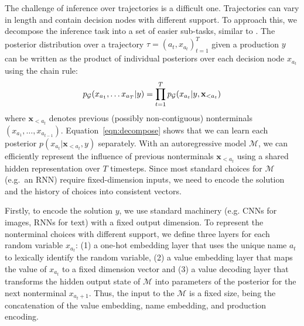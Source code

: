 The challenge of inference over trajectories is a difficult one. Trajectories can vary in length and contain decision nodes with different support. To approach this, we decompose the inference task into a set of easier sub-tasks, similar to \cite{ritchie2016DAIPP,le2016inference}. The posterior distribution over a trajectory $\tau = (a_t, x_{a_t})_{t=1}^T$ given a production $y$ can be written as the product of individual posteriors over each decision node $x_{a_t}$ using the chain rule:
\begin{equation}
    \small
    p_\mathcal{G}(x_{a_1}, \ldots x_{a_T}|y) = \prod_{t=1}^{T} p_\mathcal{G}(x_{a_t}|y, \mathbf{x}_{<a_t})
\label{eqn:decompose}
\end{equation}          
where $\mathbf{x}_{<a_t}$ denotes previous (possibly non-contiguous) nonterminals $(x_{a_1}, \ldots, x_{a_{t-1}})$. Equation~\ref{eqn:decompose} shows that we can learn each posterior $p(x_{a_t}|\mathbf{x}_{<a_t},y)$ separately. With an autoregressive model $\mathcal{M}$, we can efficiently represent the influence of previous nonterminals $\mathbf{x}_{<a_t}$ using a shared hidden representation over $T$ timesteps. Since most standard choices for $\mathcal{M}$ (e.g.~an RNN) require fixed-dimension inputs, we need to encode the solution and the history of choices into consistent vectors.

Firstly, to encode the solution $y$, we use standard machinery (e.g. CNNs for images, RNNs for text) with a fixed output dimension.  To represent the nonterminal choices with different support, we define three layers for each random variable $x_{a_t}$: (1) a one-hot embedding layer that uses the unique name $a_t$ to lexically identify the random variable, (2) a value embedding layer that maps the value of $x_{a_t}$ to a fixed dimension vector and (3) a value decoding layer that transforms the hidden output state of $\mathcal{M}$ into parameters of the posterior for the next nonterminal $x_{a_t+1}$. Thus, the input to the $\mathcal{M}$ is a fixed size, being the concatenation of the value embedding, name embedding, and production encoding.

